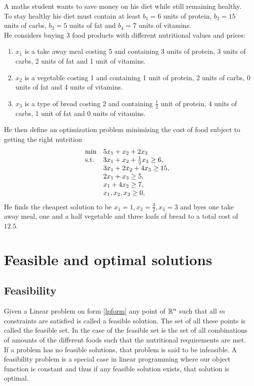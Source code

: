 \begin{example}\label{lpex}
A maths student wants to save money on his diet while still remaining healthy. To stay healthy his diet must contain at least $b_1=6$ units of protein, $b_2=15$ units of carbs, $b_3=5$ units of fat and $b_4=7$ units of vitamins.\\
He considers buying 3 food products with different nutritional values and prices: 
\begin{enumerate}
\item $x_1$ is a take away meal costing 5 and containing 3 units of protein, 3 units of carbs, 2 units of fat and 1 unit of vitamins.
\item $x_2$ is a vegetable costing 1 and containing 1 unit of protein, 2 units of carbs, 0 units of fat and 4 units of vitamins.
\item $x_3$ is a type of bread costing 2 and containing $\frac{1}{2}$ unit of protein, 4 units of carbs, 1 unit of fat and 0 units of vitamins.
\end{enumerate}
He then define an optimization problem minimizing the cost of food subject to getting the right nutrition
\begin{align}
\begin{array}{ll@{}ll}
\text{min} &5x_1+x_2+2x_3&\\
\text{s.t.} &3x_1+x_2+\frac{1}{2}x_3 \geq 6,&\\
&3x_1+2x_2+4x_3 \geq 15,&\\
&2x_1+x_3 \geq 5,&\\
&x_1+4x_2 \geq 7,&\\
&x_1,x_2,x_3 \geq 0,&\\
\end{array}
\end{align}
He finds the cheapest solution to be $x_1 = 1, x_2= \frac{3}{2},x_3 = 3$ and byes one take away meal, one and a half vegetable and three loafs of bread to a total cost of $12.5$.
\end{example}
\section{Feasible and optimal solutions}
\subsection{Feasibility}
Given a Linear problem on form \ref{lpform} any point of $\mathbb{R}^n$ such that all $m$ constraints are satisfied is called a feasible solution. The set of all these points is called the feasible set. In the case of  the feasible set is the set of all combinations of amounts of the different foods such that the nutritional requirements are met. If a problem has no feasible solutions, that problem is said to be infeasible. A feasibility problem is a special case in linear programming where our object function is constant and thus if any feasible solution exists, that solution is optimal.
